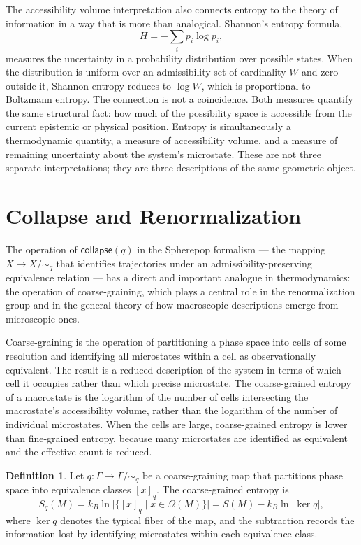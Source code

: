 \documentclass[12pt,openany]{book}
\theoremstyle{plain}
\theoremstyle{definition}
\newtheorem{definition}[theorem]{Definition}
\theoremstyle{remark}
\newcommand{\scollapse}[1]{\mathsf{collapse}\!\left(#1\right)}
\begin{document}
The accessibility volume interpretation also connects entropy to the theory of information in a way that is more than analogical. Shannon's entropy formula,
\[
  H = -\sum_i p_i \log p_i,
\]
measures the uncertainty in a probability distribution over possible states. When the distribution is uniform over an admissibility set of cardinality $W$ and zero outside it, Shannon entropy reduces to $\log W$, which is proportional to Boltzmann entropy. The connection is not a coincidence. Both measures quantify the same structural fact: how much of the possibility space is accessible from the current epistemic or physical position. Entropy is simultaneously a thermodynamic quantity, a measure of accessibility volume, and a measure of remaining uncertainty about the system's microstate. These are not three separate interpretations; they are three descriptions of the same geometric object.

\section{Collapse and Renormalization}

The operation of $\scollapse{q}$ in the Spherepop formalism — the mapping $X \to X/{\sim_q}$ that identifies trajectories under an admissibility-preserving equivalence relation — has a direct and important analogue in thermodynamics: the operation of coarse-graining, which plays a central role in the renormalization group and in the general theory of how macroscopic descriptions emerge from microscopic ones.

Coarse-graining is the operation of partitioning a phase space into cells of some resolution and identifying all microstates within a cell as observationally equivalent. The result is a reduced description of the system in terms of which cell it occupies rather than which precise microstate. The coarse-grained entropy of a macrostate is the logarithm of the number of cells intersecting the macrostate's accessibility volume, rather than the logarithm of the number of individual microstates. When the cells are large, coarse-grained entropy is lower than fine-grained entropy, because many microstates are identified as equivalent and the effective count is reduced.

\begin{definition}
Let $q : \Gamma \to \Gamma/{\sim_q}$ be a coarse-graining map that partitions phase space into equivalence classes $[x]_q$. The coarse-grained entropy is
\[
  S_q(M) = k_B \ln \lvert \{ [x]_q \mid x \in \Omega(M) \} \rvert
          = S(M) - k_B \ln \lvert \ker q \rvert,
\]
where $\ker q$ denotes the typical fiber of the map, and the subtraction records the information lost by identifying microstates within each equivalence class.
\end{definition}
\end{document}
